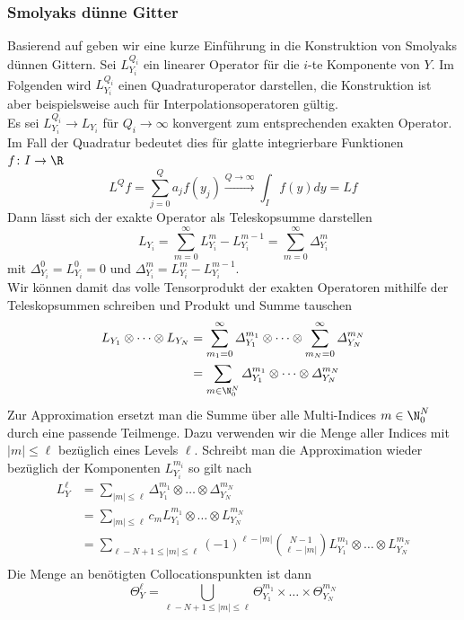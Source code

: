 \subsubsection{Smolyaks dünne Gitter}
Basierend auf \autocite{ConradMarzouk} geben wir eine kurze Einführung in die Konstruktion von Smolyaks dünnen Gittern. Sei $L_{Y_i}^{Q_i}$ ein linearer Operator für die $i$-te Komponente von $Y$. Im Folgenden wird $L_{Y_i}^{Q_i}$ einen Quadraturoperator darstellen, die Konstruktion ist aber beispielsweise auch für Interpolationsoperatoren gültig.\\
Es sei $L_{Y_i}^{Q_i}\to L_{Y_i}$ für $Q_i\to\infty$ konvergent zum entsprechenden exakten Operator. Im Fall der Quadratur bedeutet dies für glatte integrierbare Funktionen $f\colon I\to\R$
\[L^Qf=\sum_{j=0}^Q a_jf(y_j)\xrightarrow[]{Q\to\infty}\int_If(y)dy=Lf\]
Dann lässt sich der exakte Operator als Teleskopsumme darstellen
\[L_{Y_i}=\sum_{m=0}^\infty L_{Y_i}^m - L_{Y_i}^{m-1}=\sum_{m=0}^\infty \varDelta_{Y_i}^m\]
mit $\varDelta_{Y_i}^0=L_{Y_i}^0=0$ und $\varDelta_{Y_i}^m=L_{Y_i}^m-L_{Y_i}^{m-1}$.\\
Wir können damit das volle Tensorprodukt der exakten Operatoren mithilfe der Teleskopsummen schreiben und Produkt und Summe tauschen
\begin{align*}
L_{Y_1}\otimes\dots\otimes L_{Y_N}&=\sum_{m_1=0}^\infty \varDelta_{Y_1}^{m_1}\otimes\dots\otimes \sum_{m_N=0}^\infty\varDelta_{Y_N}^{m_N}\\
&=\sum_{m\in\N_0^N} \varDelta_{Y_1}^{m_1}\otimes\dots\otimes \varDelta_{Y_N}^{m_N}\\
\end{align*}
Zur Approximation ersetzt man die Summe über alle Multi-Indices $m\in\N_0^N$ durch eine passende Teilmenge. Dazu verwenden wir die Menge aller Indices mit $|m|\le \ell$ bezüglich eines Levels $\ell$. Schreibt man die Approximation wieder bezüglich der Komponenten $L_{Y_i}^{m_i}$ so gilt nach \autocite{NoTeWe07}
\begin{align*}
L_Y^\ell &= \sum_{|m|\le \ell} \varDelta_{Y_1}^{m_1}\otimes\dots\otimes \varDelta_{Y_N}^{m_N}\\
&= \sum_{|m|\le \ell} c_m L_{Y_1}^{m_1}\otimes\dots\otimes L_{Y_N}^{m_N}\\
&= \sum_{\ell - N+1\le |m|\le \ell} (-1)^{\ell - |m|}\binom{N-1}{\ell - |m|}L_{Y_1}^{m_1}\otimes\dots\otimes L_{Y_N}^{m_N}\\
\end{align*}
Die Menge an benötigten Collocationspunkten ist dann 
\[\Theta_Y^\ell=\bigcup_{\ell - N+1\le |m|\le \ell} \Theta_{Y_1}^{m_1}\times\dots\times \Theta_{Y_N}^{m_N}\]

